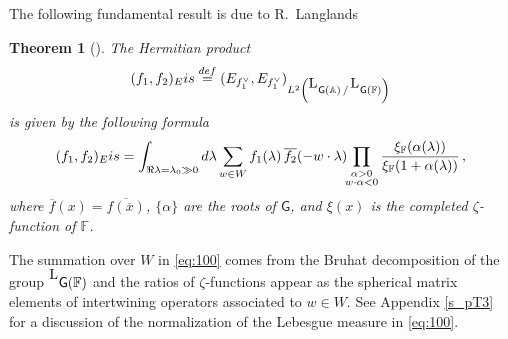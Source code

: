 \documentclass[14pt]{extarticle}
\newcommand{\A}{\mathbb{A}}
\newcommand{\F}{\mathbb{F}}
\newcommand{\bG}{\mathsf{G}}
\newcommand{\La}{{}^{\raisebox{2pt}{\textup{\tiny\textsf{L}}}}}
\DeclareMathOperator{\chr}{char}
\newcommand{\Eis}{\textup{Eis}}
\newtheorem{Theorem}{Theorem}
\theoremstyle{definition}
\begin{document}
The following fundamental result is due to R.~Langlands

\begin{Theorem}[\cite{L}] \label{t_Langl} 
  The Hermitian product
  \begin{equation}
    \label{eq:99}
    (f_1,f_2)_\Eis \overset{\textup{\tiny def}}=
    (E_{f_1^\vee}, E_{f_1^\vee})_{L^2\left(\La\bG(\A)\,/\,\La\bG(\F)\right)}
  \end{equation}
  is given by the following
  formula
% 
  \begin{equation}
    \label{eq:100}
   (f_1,f_2)_\Eis =
  \int_{\Re \lambda = \lambda_0 \gg 0}
  d\lambda \sum_{w\in W} f_1(\lambda) \, \overline{f_2}(- w
    \cdot \lambda) \!\!
  \prod_{\substack{\alpha > 0 \\ w\cdot \alpha <0 }}
  \frac{\xi_\F(\alpha(\lambda))}{\xi_\F(1+\alpha(\lambda))} \,,
\end{equation}
%
where $\overline{f}(x) = \overline{f(\overline{x})}$,
$\{\alpha\}$ are the roots of $\bG$, and
$\xi(x)$ is the completed $\zeta$-function of $\F$.
\end{Theorem}

\noindent
The summation over $W$ in \eqref{eq:100} 
comes from the Bruhat decomposition of the group
$\La\bG(\F)$ and 
the ratios of $\zeta$-functions appear as the
spherical matrix elements of intertwining operators
associated to $w\in W$.
See Appendix \ref{s_pT3} for a discussion of the normalization of the
Lebesgue measure in \eqref{eq:100}.





\subsubsection{}
\end{document}
